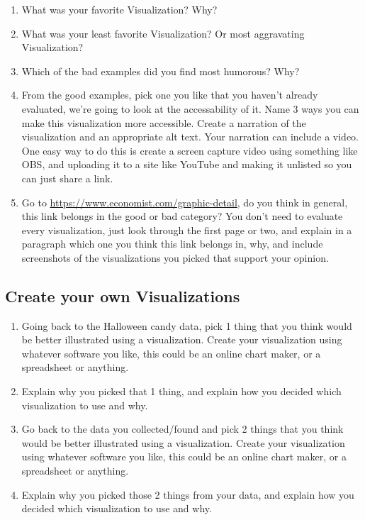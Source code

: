 \documentclass[12pt]{article}
\begin{document}
    \begin{enumerate}
        \item What was your favorite Visualization? Why? 
        \item What was your least favorite Visualization? Or most aggravating Visualization?
        \item Which of the bad examples did you find most humorous? Why?
        \item From the good examples, pick one you like that you haven't already evaluated, we're going to look at the accessability of it. Name 3 ways you can make this visualization more accessible.  Create a narration of the visualization and an appropriate alt text.  Your narration can include a video.  One easy way to do this is create a screen capture video using something like OBS, and uploading it to a site like YouTube and making it unlisted so you can just share a link. 
        \item Go to \url{https://www.economist.com/graphic-detail}, do you think in general, this link belongs in the good or bad category? You don't need to evaluate every visualization, just look through the first page or two, and explain in a paragraph which one you think this link belongs in, why, and include screenshots of the visualizations you picked that support your opinion.
    \end{enumerate}


    \subsection*{Create your own Visualizations}
    \begin{enumerate}
        \item Going back to the Halloween candy data, pick 1 thing that you think would be better illustrated using a visualization.  Create your visualization using whatever software you like, this could be an online chart maker, or a spreadsheet or anything. 
        \item Explain why you picked that 1 thing, and explain how you decided which visualization to use and why.
        \item Go back to the data you collected/found and pick 2 things that you think would be better illustrated using a visualization. Create your visualization using whatever software you like, this could be an online chart maker, or a spreadsheet or anything. 
        \item Explain why you picked those 2 things from your data, and explain how you decided which visualization to use and why.
    \end{enumerate}
\end{document}

